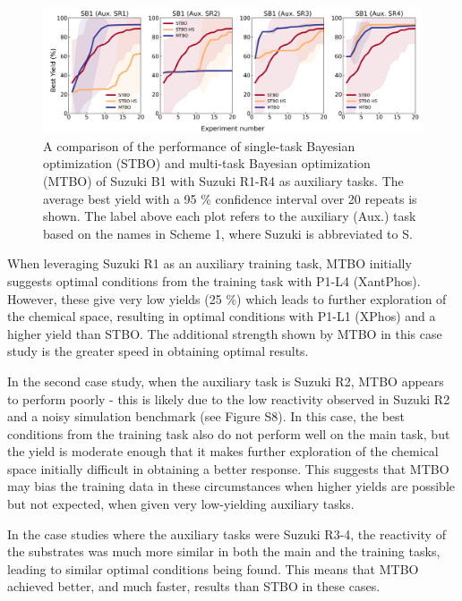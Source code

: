 \begin{figure}
    \centering
    \includegraphics[width=1.2\textwidth]{gfx/Chapter03/baumgartner_suzuki_reizman_suzuki_one_cotraining_optimization.png}
    \caption{A comparison of the performance of single-task Bayesian optimization (STBO) and multi-task Bayesian optimization (MTBO) of Suzuki B1 with Suzuki R1-R4 as auxiliary tasks. The average best yield with a 95 \% confidence interval over 20 repeats is shown. The label above each plot refers to the auxiliary (Aux.) task based on the names in Scheme 1, where Suzuki is abbreviated to S.}
    \label{fig:baumgartner_multitask}
\end{figure}

When leveraging Suzuki R1 as an auxiliary training task, MTBO initially suggests optimal conditions from the training task with P1-L4 (XantPhos). However, these give very low yields (25 \%) which leads to further exploration of the chemical space, resulting in optimal conditions with P1-L1 (XPhos) and a higher yield than STBO. The additional strength shown by MTBO in this case study is the greater speed in obtaining optimal results.

In the second case study, when the auxiliary task is Suzuki R2, MTBO appears to perform poorly - this is likely due to the low reactivity observed in Suzuki R2 and a noisy simulation benchmark (see Figure S8). In this case, the best conditions from the training task also do not perform well on the main task, but the yield is moderate enough that it makes further exploration of the chemical space initially difficult in obtaining a better response. This suggests that MTBO may bias the training data in these circumstances when higher yields are possible but not expected, when given very low-yielding auxiliary tasks. 

In the case studies where the auxiliary tasks were Suzuki R3-4, the reactivity of the substrates was much more similar in both the main and the training tasks, leading to similar optimal conditions being found. This means that MTBO achieved better, and much faster, results than STBO in these cases. 

